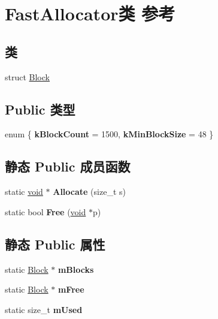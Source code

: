 \hypertarget{class_fast_allocator}{}\section{Fast\+Allocator类 参考}
\label{class_fast_allocator}
\subsection*{类}
\begin{DoxyCompactItemize}
\item 
struct \hyperlink{struct_fast_allocator_1_1_block}{Block}
\end{DoxyCompactItemize}
\subsection*{Public 类型}
\begin{DoxyCompactItemize}
\item 
\mbox{\label{class_fast_allocator_ad99d8a7eb2ab54abd4e5de71a0d4aa3c}} 
enum \{ {\bfseries k\+Block\+Count} = 1500, 
{\bfseries k\+Min\+Block\+Size} = 48
 \}
\end{DoxyCompactItemize}
\subsection*{静态 Public 成员函数}
\begin{DoxyCompactItemize}
\item 
\mbox{\label{class_fast_allocator_a99c8d738ddce7bd8ebf5435f074353d2}} 
static \hyperlink{interfacevoid}{void} $\ast$ {\bfseries Allocate} (size\+\_\+t s)
\item 
\mbox{\label{class_fast_allocator_a9efa06baa4c74c5f8f3b18b72249a25a}} 
static bool {\bfseries Free} (\hyperlink{interfacevoid}{void} $\ast$p)
\end{DoxyCompactItemize}
\subsection*{静态 Public 属性}
\begin{DoxyCompactItemize}
\item 
static \hyperlink{struct_fast_allocator_1_1_block}{Block} $\ast$ {\bfseries m\+Blocks}
\item 
\mbox{\label{class_fast_allocator_ad4b208fad96d51f85d7c075506bd5d2f}} 
static \hyperlink{struct_fast_allocator_1_1_block}{Block} $\ast$ {\bfseries m\+Free}
\item 
\mbox{\label{class_fast_allocator_a389615f3bfb2e682e63fe32af69c54c6}} 
static size\+\_\+t {\bfseries m\+Used}
\end{DoxyCompactItemize}
